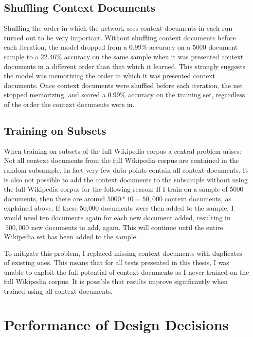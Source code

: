 \subsection{Shuffling Context Documents}

Shuffling the order in which the network sees context documents in each run turned out to be very important. Without shuffling
context documents before each iteration, the model dropped from a 0.99\% accuracy on a 5000 document sample to a 22.46\% accuracy
on the same sample when it was presented context documents in a different order than that which it learned. This strongly
suggests the model was memorizing the order in which it was presented context documents. Once context documents were shuffled
before each iteration, the net stopped memorizing, and scored a 0.99\% accuracy on the training set, regardless of the order
the context documents were in.

\subsection{Training on Subsets}

When training on subsets of the full Wikipedia corpus a central problem arises: Not all context documents from the full Wikipedia
corpus are contained in the random subsample. In fact very few data points contain all context documents. It is also not possible
to add the context documents to the subsample without using the full Wikipedia corpus for the following reason: If I train on a
sample of 5000 documents, then there are around $5000 * 10 = 50,000$ context documents, as explained above. If these 50,000
documents were then added to the sample, I would need ten documents again for each new document added, resulting in $~500,000$ new
documents to add, again. This will continue until the entire Wikipedia set has been added to the sample.

To mitigate this problem, I replaced missing context documents with duplicates of existing ones. This means that for all tests
presented in this thesis, I was unable to exploit the full potential of context documents as I never trained on the full Wikipedia
corpus. It is possible that results improve significantly when trained using all context documents.


\section{Performance of Design Decisions}

